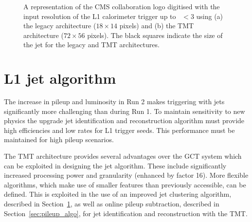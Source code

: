 \begin{figure}
\centering
{} \quad
{} 
\caption{A representation of the CMS collaboration logo digitised with the input resolution of the L1 calorimeter trigger up to 
\etaabs~$< 3$ using (a) the legacy architecture ($18 \times 14$ pixels) and (b) the TMT architecture ($72 \times 56$ pixels). The black squares indicate
the size of the jet for the legacy and TMT architectures.}
\label{fig:inputres}
\end{figure}

\section{L1 jet algorithm}
\label{sec:jet_algo}

The increase in pileup and luminosity in Run 2 makes triggering with jets
significantly more challenging than during Run 1. To maintain sensitivity to
new physics the upgrade jet identification and reconstruction 
algorithm must provide high efficiencies and low rates for L1 trigger seeds.
This performance must be maintained for high pileup scenarios.

The TMT architecture provides several advantages over the GCT system which can be 
exploited in designing the jet algorithm. These include significantly increased processing power
and granularity (enhanced by factor 16). More flexible algorithms, which 
make use of smaller features than previously accessible, can be defined. This is exploited in the 
use of an improved jet clustering algorithm, described in Section~\ref{sec:jet_algo}, as well as 
online pileup subtraction, described in Section~\ref{sec:pileup_algo}, for jet 
identification and reconstruction with the TMT.


